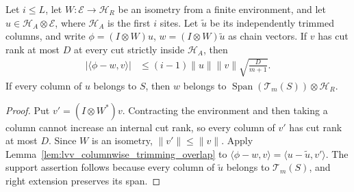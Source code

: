 \begin{lemma}
    \label{lem:lvv_physical_column_trimming}
    \leanok
    Let $i\le L$, let $W:\mathcal E\to\mathcal H_R$ be an isometry from a
    finite environment, and let $u\in\mathcal H_A\otimes\mathcal E$, where
    $\mathcal H_A$ is the first $i$ sites. Let $\widetilde u$ be its
    independently trimmed columns, and write
    $\phi=(I\otimes W)u$, $w=(I\otimes W)\widetilde u$ as chain vectors.
    If $v$ has cut rank at most $D$ at every cut strictly inside
    $\mathcal H_A$, then
    \begin{align}
        |\langle\phi-w,v\rangle|
         & \le(i-1)\|u\|\|v\|\sqrt{\frac{D}{m+1}}.
    \end{align}
    If every column of $u$ belongs to $S$, then $w$ belongs to
    $\operatorname{Span}(\mathcal T_m(S))\otimes\mathcal H_R$.
\end{lemma}
\begin{proof}
    \leanok
    Put $v'=(I\otimes W^*)v$. Contracting the environment and then taking a
    column cannot increase an internal cut rank, so every column of $v'$
    has cut rank at most $D$. Since $W$ is an isometry, $\|v'\|\le\|v\|$.
    Apply Lemma~\ref{lem:lvv_columnwise_trimming_overlap} to
    $\langle\phi-w,v\rangle=\langle u-\widetilde u,v'\rangle$.
    The support assertion follows because every column of $\widetilde u$
    belongs to $\mathcal T_m(S)$, and right extension preserves its span.
\end{proof}

